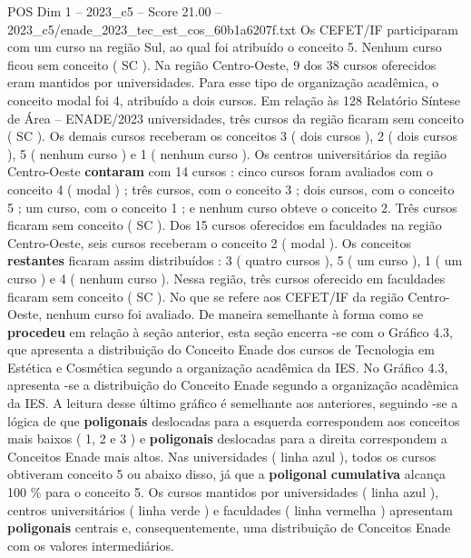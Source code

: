 \begin{textsample}{POS Dim 1 – 2023\_c5 – Score 21.00 – 2023\_c5/enade\_2023\_tec\_est\_cos\_60b1a6207f.txt}
Os CEFET/IF participaram com um curso na região Sul, ao qual foi atribuído o conceito 5.
Nenhum curso ficou sem conceito ( SC ).
Na região Centro-Oeste, 9 dos 38 cursos oferecidos eram mantidos por universidades.
Para esse tipo de organização acadêmica, o conceito modal foi 4, atribuído a dois cursos.
Em relação às 128 Relatório Síntese de Área – ENADE/2023 universidades, três cursos da região ficaram sem conceito ( SC ).
Os demais cursos receberam os conceitos 3 ( dois cursos ), 2 ( dois cursos ), 5 ( nenhum curso ) e 1 ( nenhum curso ).
Os centros universitários da região Centro-Oeste \textbf{contaram} com 14 cursos : cinco cursos foram avaliados com o conceito 4 ( modal ) ; três cursos, com o conceito 3 ; dois cursos, com o conceito 5 ; um curso, com o conceito 1 ; e nenhum curso obteve o conceito 2.
Três cursos ficaram sem conceito ( SC ).
Dos 15 cursos oferecidos em faculdades na região Centro-Oeste, seis cursos receberam o conceito 2 ( modal ).
Os conceitos \textbf{restantes} ficaram assim distribuídos : 3 ( quatro cursos ), 5 ( um curso ), 1 ( um curso ) e 4 ( nenhum curso ).
Nessa região, três cursos oferecido em faculdades ficaram sem conceito ( SC ).
No que se refere aos CEFET/IF da região Centro-Oeste, nenhum curso foi avaliado.
De maneira semelhante à forma como se \textbf{procedeu} em relação à seção anterior, esta seção encerra -se com o Gráfico 4.3, que apresenta a distribuição do Conceito Enade dos cursos de Tecnologia em Estética e Cosmética segundo a organização acadêmica da IES.
No Gráfico 4.3, apresenta -se a distribuição do Conceito Enade segundo a organização acadêmica da IES.
A leitura desse último gráfico é semelhante aos anteriores, seguindo -se a lógica de que \textbf{poligonais} deslocadas para a esquerda correspondem aos conceitos mais baixos ( 1, 2 e 3 ) e \textbf{poligonais} deslocadas para a direita correspondem a Conceitos Enade mais altos.
Nas universidades ( linha azul ), todos os cursos obtiveram conceito 5 ou abaixo disso, já que a \textbf{poligonal} \textbf{cumulativa} alcança 100 \% para o conceito 5.
Os cursos mantidos por universidades ( linha azul ), centros universitários ( linha verde ) e faculdades ( linha vermelha ) apresentam \textbf{poligonais} centrais e, consequentemente, uma distribuição de Conceitos Enade com os valores intermediários.

\end{textsample}
